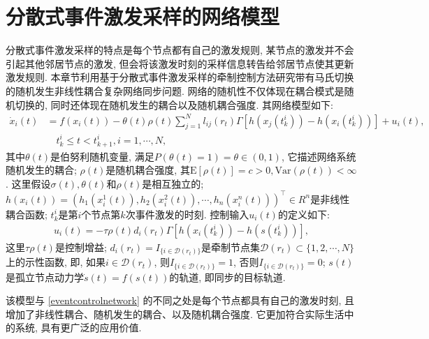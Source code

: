 \section{分散式事件激发采样的网络模型}\label{csnp:sec:moper}
        分散式事件激发采样的特点是每个节点都有自己的激发规则, 某节点的激发并不会引起其他邻居节点的激发, 但会将该激发时刻的采样信息转告给邻居节点使其更新激发规则. 本章节利用基于分散式事件激发采样的牵制控制方法研究带有马氏切换的随机发生非线性耦合复杂网络同步问题. 网络的随机性不仅体现在耦合模式是随机切换的, 同时还体现在随机发生的耦合以及随机耦合强度. 其网络模型如下:
        \begin{align}\label{sys:init1}
        \nonumber\dot{x}_{i}(t)&=f(x_{i}(t))-\theta(t)\rho(t)\sum^N_{j=1}l_{ij}(r_{t})\Gamma[h(x_{j}(t_{k}^{i}))-h(x_{i}(t_{k}^{i}))]+u_i(t), \\
        &\quad t_{k}^i\leq t< t_{k+1}^i, i = 1,\cdots,N,
        \end{align}
        其中$\theta(t)$是伯努利随机变量, 满足$P(\theta(t)=1)=\theta\in(0,1)$, 它描述网络系统随机发生的耦合;
        $\rho(t)$是随机耦合强度, 其$\mathrm{E}[\rho(t)]=c>0, \mathrm{Var}(\rho(t))<\infty$. 这里假设$\sigma(t), \theta(t)$和$\rho(t)$是相互独立的; $h( x_{i}(t))=(h_{1}(x_{i}^{1}(t)),h_{2}(x_{i}^{2}(t)),\cdots,h_{n}(x_{i}^{n}(t)))^{\top}\in R^{n}$是非线性耦合函数;
        $t_k^i$是第$i$个节点第$k$次事件激发的时刻.
        控制输入$u_i(t)$的定义如下:
        \begin{align}\label{nonlinearcontrol}
            u_i(t)=-\tau \rho(t)d_{i}(r_{t})\Gamma[h(x_{i}(t_{k}^{i}))-h(s(t_{k}^{i}))],
        \end{align}
        这里$\tau\rho(t)$是控制增益; $d_{i}(r_{t})=I_{\{i\in \mathcal D(r_{t})\}}$是牵制节点集$\mathcal D(r_{t})\subset \{1,2,\cdots,N\}$上的示性函数, 即, 如果$i\in \mathcal D(r_{t})$, 则$I_{\{i\in \mathcal D(r_{t})\}}=1$, 否则$I_{\{i\in \mathcal D(r_{t})\}}=0$; $s(t)$ 是孤立节点动力学$\dot{s}(t)=f(s(t))$的轨道, 即同步的目标轨道.
        \begin{rem}
            该模型与 \eqref{eventcontrolnetwork} 的不同之处是每个节点都具有自己的激发时刻, 且增加了非线性耦合、随机发生的耦合、以及随机耦合强度. 它更加符合实际生活中的系统, 具有更广泛的应用价值.
        \end{rem}

